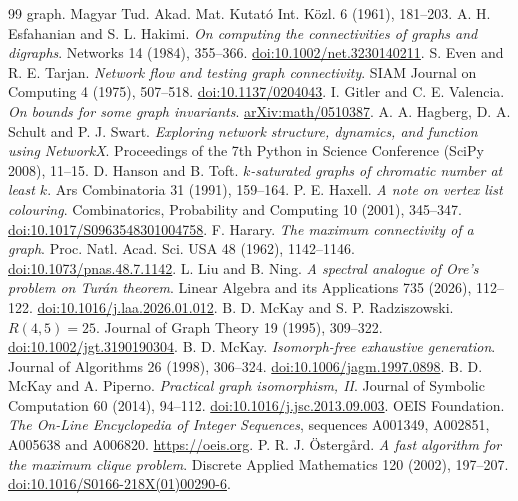 \documentclass[11pt]{article}
\theoremstyle{definition}
\theoremstyle{remark}
\begin{document}
\begin{thebibliography}{99}
{graph}. Magyar Tud. Akad. Mat. Kutat\'o Int. K\"ozl. 6 (1961), 181--203.
 A. H. Esfahanian and S. L. Hakimi. \emph{On computing the connectivities of graphs and
digraphs}. Networks 14 (1984), 355--366. \href{https://doi.org/10.1002/net.3230140211}{doi:10.1002/net.3230140211}.
 S. Even and R. E. Tarjan. \emph{Network flow and testing graph connectivity}. SIAM Journal on
Computing 4 (1975), 507--518. \href{https://doi.org/10.1137/0204043}{doi:10.1137/0204043}.
 I. Gitler and C. E. Valencia. \emph{On bounds for some graph invariants}.
\href{https://arxiv.org/abs/math/0510387}{arXiv:math/0510387}.
 A. A. Hagberg, D. A. Schult and P. J. Swart. \emph{Exploring network structure, dynamics, and
function using NetworkX}. Proceedings of the 7th Python in Science Conference (SciPy 2008), 11--15.
 D. Hanson and B. Toft. \emph{$k$-saturated graphs of chromatic number at least $k$}. Ars
Combinatoria 31 (1991), 159--164.
 P. E. Haxell. \emph{A note on vertex list colouring}. Combinatorics, Probability and
Computing 10 (2001), 345--347. \href{https://doi.org/10.1017/S0963548301004758}{doi:10.1017/S0963548301004758}.
 F. Harary. \emph{The maximum connectivity of a graph}. Proc. Natl. Acad. Sci. USA 48 (1962),
1142--1146. \href{https://doi.org/10.1073/pnas.48.7.1142}{doi:10.1073/pnas.48.7.1142}.
 L. Liu and B. Ning. \emph{A spectral analogue of Ore's problem on Tur\'an theorem}. Linear Algebra
and its Applications 735 (2026), 112--122. \href{https://doi.org/10.1016/j.laa.2026.01.012}{doi:10.1016/j.laa.2026.01.012}.
 B. D. McKay and S. P. Radziszowski. \emph{$R(4,5)=25$}. Journal of Graph Theory 19
(1995), 309--322. \href{https://doi.org/10.1002/jgt.3190190304}{doi:10.1002/jgt.3190190304}.
 B. D. McKay. \emph{Isomorph-free exhaustive generation}. Journal of Algorithms 26 (1998), 306--324.
\href{https://doi.org/10.1006/jagm.1997.0898}{doi:10.1006/jagm.1997.0898}.
 B. D. McKay and A. Piperno. \emph{Practical graph isomorphism, II}. Journal of Symbolic Computation 60
(2014), 94--112. \href{https://doi.org/10.1016/j.jsc.2013.09.003}{doi:10.1016/j.jsc.2013.09.003}.
 OEIS Foundation. \emph{The On-Line Encyclopedia of Integer Sequences}, sequences A001349, A002851,
A005638 and A006820. \url{https://oeis.org}.
 P. R. J. \"Osterg\aa rd. \emph{A fast algorithm for the maximum clique problem}. Discrete Applied
Mathematics 120 (2002), 197--207. \href{https://doi.org/10.1016/S0166-218X(01)00290-6}{doi:10.1016/S0166-218X(01)00290-6}.

\end{thebibliography}
\end{document}

